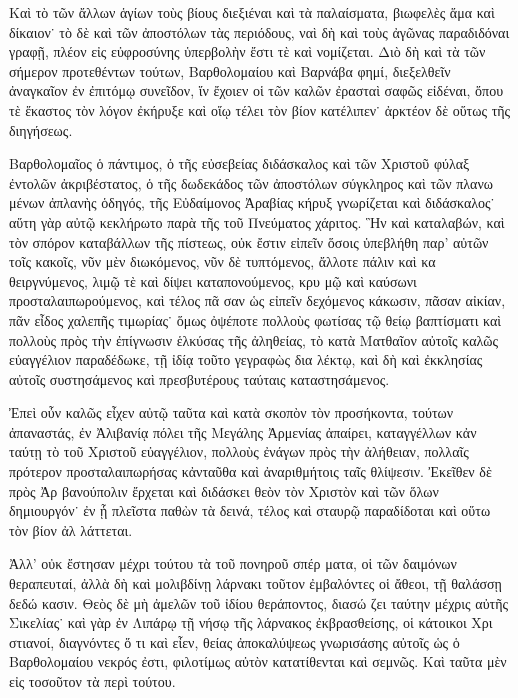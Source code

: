 


Καὶ τὸ τῶν ἄλλων ἁγίων τοὺς βίους διεξιέναι καὶ
τὰ παλαίσματα, βιωφελὲς ἅμα καὶ δίκαιον˙ τὸ δὲ καὶ
τῶν ἀποστόλων τὰς περιόδους, ναὶ δὴ καὶ τοὺς ἀγῶνας
παραδιδόναι γραφῇ, πλέον εἰς εὐφροσύνης ὑπερβολὴν
ἔστι τὲ καὶ νομίζεται. Διὸ δὴ καὶ τὰ τῶν σήμερον
προτεθέντων τούτων, Βαρθολομαίου καὶ Βαρνάβα φημί,
διεξελθεῖν ἀναγκαῖον ἐν ἐπιτόμῳ συνεῖδον, ἵν ἔχοιεν οἱ
τῶν καλῶν ἐρασταὶ σαφῶς εἰδέναι, ὅπου τὲ ἕκαστος
τὸν λόγον ἐκήρυξε καὶ οἵῳ τέλει τὸν βίον κατέλιπεν˙
ἀρκτέον δὲ οὕτως τῆς διηγήσεως.

Βαρθολομαῖος ὁ πάντιμος, ὁ τῆς εὐσεβείας διδάσκαλος
καὶ τῶν Χριστοῦ φύλαξ ἐντολῶν ἀκριβέστατος, ὁ τῆς
δωδεκάδος τῶν ἀποστόλων σύγκληρος καὶ τῶν πλανω%
μένων ἀπλανὴς ὁδηγός, τῆς Εὐδαίμονος Ἀραβίας κήρυξ
γνωρίζεται καὶ διδάσκαλος˙ αὕτη γὰρ αὐτῷ κεκλήρωτο
παρὰ τῆς τοῦ Πνεύματος χάριτος. Ἣν καὶ καταλαβών,
καὶ τὸν σπόρον καταβάλλων τῆς πίστεως, οὐκ ἔστιν
εἰπεῖν ὅσοις ὑπεβλήθη παρ’ αὐτῶν τοῖς κακοῖς, νῦν μὲν
διωκόμενος, νῦν δὲ τυπτόμενος, ἄλλοτε πάλιν καὶ κα%
θειργνύμενος, λιμῷ τὲ καὶ δίψει καταπονούμενος, κρυ%
μῷ καὶ καύσωνι προσταλαιπωρούμενος, καὶ τέλος πᾶ%
σαν ὡς εἰπεῖν δεχόμενος κάκωσιν, πᾶσαν αἰκίαν, πᾶν
εἶδος χαλεπῆς τιμωρίας˙ ὅμως ὀψέποτε πολλοὺς φωτίσας
τῷ θείῳ βαπτίσματι καὶ πολλοὺς πρὸς τὴν ἐπίγνωσιν
ἑλκύσας τῆς ἀληθείας, τὸ κατὰ Ματθαῖον αὐτοῖς καλῶς
εὐαγγέλιον παραδέδωκε, τῇ ἰδίᾳ τοῦτο γεγραφὼς δια%
λέκτῳ, καὶ δὴ καὶ ἐκκλησίας αὐτοῖς συστησάμενος καὶ
πρεσβυτέρους ταύταις καταστησάμενος.

Ἐπεὶ οὖν καλῶς εἶχεν αὐτῷ ταῦτα καὶ κατὰ σκοπὸν
τὸν προσήκοντα, τούτων ἀπαναστάς, ἐν Ἀλιβανίᾳ πόλει
τῆς Μεγάλης Ἀρμενίας ἀπαίρει, καταγγέλλων κἀν ταύτῃ
τὸ τοῦ Χριστοῦ εὐαγγέλιον, πολλοὺς ἐνάγων πρὸς τὴν
ἀλήθειαν, πολλαῖς πρότερον προσταλαιπωρήσας κἀνταῦθα
καὶ ἀναριθμήτοις ταῖς θλίψεσιν. Ἐκεῖθεν δὲ πρὸς Ἀρ%
βανούπολιν ἔρχεται καὶ διδάσκει θεὸν τὸν Χριστὸν καὶ
τῶν ὅλων δημιουργόν˙ ἐν ᾗ πλεῖστα παθὼν τὰ δεινά,
τέλος καὶ σταυρῷ παραδίδοται καὶ οὕτω τὸν βίον ἀλ%
λάττεται.

Ἀλλ’ οὐκ ἔστησαν μέχρι τούτου τὰ τοῦ πονηροῦ σπέρ%
ματα, οἱ τῶν δαιμόνων θεραπευταί, ἀλλὰ δὴ καὶ μολιβδίνῃ
λάρνακι τοῦτον ἐμβαλόντες οἱ ἄθεοι, τῇ θαλάσσῃ δεδώ%
κασιν. Θεὸς δὲ μὴ ἀμελῶν τοῦ ἰδίου θεράποντος, διασώ%
ζει ταύτην μέχρις αὐτῆς Σικελίας˙ καὶ γὰρ ἐν Λιπάρῳ
τῇ νήσῳ τῆς λάρνακος ἐκβρασθείσης, οἱ κάτοικοι Χρι%
στιανοί, διαγνόντες ὅ τι καὶ εἶεν, θείας ἀποκαλύψεως
γνωρισάσης αὐτοῖς ὡς ὁ Βαρθολομαίου νεκρός ἐστι,
φιλοτίμως αὐτὸν κατατίθενται καὶ σεμνῶς. Καὶ ταῦτα μὲν
εἰς τοσοῦτον τὰ περὶ τούτου.

